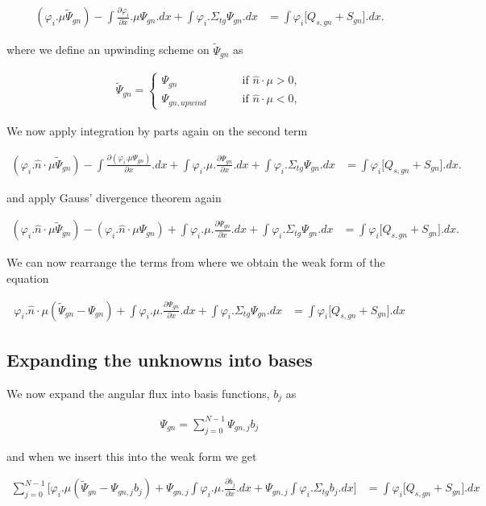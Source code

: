 \documentclass[11pt,letterpaper,titlepage]{article}
\numberwithin{equation}{section}
\newcommand{\beq}{\begin{equation*}
\begin{aligned}}
\newcommand{\eeq}{\end{aligned}
\end{equation*}}
\newcommand{\beqn}{\begin{equation}
	\begin{aligned}}
\newcommand{\eeqn}{\end{aligned}
	\end{equation}}
\begin{document}
\beq
(\varphi_i.\mu\tilde{\Psi}_{gn})
-\int  \frac{\partial \varphi_i}{\partial x} . \mu\Psi_{gn}  .dx
+\int \varphi_i.\Sigma_{tg}  \Psi_{gn}.dx
&= \int \varphi_i \biggr[Q_{s,gn}
+  S_{gn} \biggr].dx.
\eeq 

where we define an upwinding scheme on $\tilde{\Psi}_{gn}$ as

\beq
\tilde{\Psi}_{gn} = 
\begin{cases}
\Psi_{gn} \quad \quad & \text{ if } \hat{n}\cdot \mu > 0, \\
\Psi_{gn,upwind} \quad \quad & \text{ if } \hat{n}\cdot \mu < 0,
\end{cases}
\eeq 

We now apply integration by parts again on the second term

\beq
(\varphi_i.\hat{n} \cdot \mu\tilde{\Psi}_{gn})
-\int  \frac{\partial (\varphi_i.\mu\Psi_{gn})}{\partial x}  .dx
+\int  \varphi_i.\mu.\frac{\partial \Psi_{gn}}{\partial x}.dx
+\int \varphi_i.\Sigma_{tg}  \Psi_{gn}.dx
&= \int \varphi_i \biggr[Q_{s,gn}
+  S_{gn} \biggr].dx.
\eeq 

and apply Gauss' divergence theorem again

\beq
(\varphi_i.\hat{n}\cdot \mu\tilde{\Psi}_{gn} )
-(\varphi_i.\hat{n}\cdot \mu\Psi_{gn})
+\int  \varphi_i.\mu.\frac{\partial \Psi_{gn}}{\partial x}.dx
+\int \varphi_i.\Sigma_{tg}  \Psi_{gn}.dx
&= \int \varphi_i \biggr[Q_{s,gn}
+  S_{gn} \biggr].dx.
\eeq 

We can now rearrange the terms from where we obtain the weak form of the equation

\beqn
\varphi_i.\hat{n}\cdot \mu(\tilde{\Psi}_{gn}-\Psi_{gn})
+\int  \varphi_i.\mu.\frac{\partial \Psi_{gn}}{\partial x}.dx
+\int \varphi_i.\Sigma_{tg}  \Psi_{gn}.dx
&= \int \varphi_i \biggr[Q_{s,gn}
+  S_{gn} \biggr].dx 
\eeqn 


\subsection{Expanding the unknowns into bases}
We now expand the angular flux into basis functions, $b_j$ as

\beq
\Psi_{gn} = \sum_{j=0}^{N-1} \Psi_{gn,j} b_j
\eeq 

and when we insert this into the weak form we get

\beq
\sum_{j=0}^{N-1}  \biggr[
\varphi_i.\mu(\tilde{\Psi}_{gn}-\Psi_{gn,j}b_j)
+\Psi_{gn,j}\int  \varphi_i.\mu.\frac{\partial b_j}{\partial x}.dx
+\Psi_{gn,j} \int \varphi_i.\Sigma_{tg} b_j.dx
\biggr]
&= \int \varphi_i \biggr[Q_{s,gn}
+  S_{gn} \biggr].dx\\
\eeq 
\end{document}
